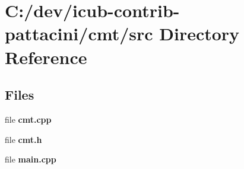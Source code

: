 \section{C\+:/dev/icub-\/contrib-\/pattacini/cmt/src Directory Reference}
\label{dir_cd359a7feb00fc4a5afc21c4824c3dae}
\subsection*{Files}
\begin{DoxyCompactItemize}
\item 
file {\bfseries cmt.\+cpp}
\item 
file {\bfseries cmt.\+h}
\item 
file {\bfseries main.\+cpp}
\end{DoxyCompactItemize}
